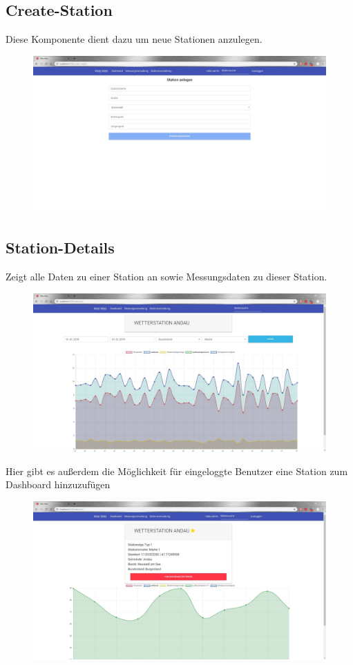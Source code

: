 \documentclass[10pt,a4paper,margin=0pt]{scrartcl}
\begin{document}
\subsection{Create-Station}
Diese Komponente dient dazu um neue Stationen anzulegen.
\begin{figure}[H]
\includegraphics[width=\textwidth]{./img/station-add.jpg}
\centering
\end{figure}
\subsection{Station-Details}
Zeigt alle Daten zu einer Station an sowie Messungsdaten zu dieser Station.
\begin{figure}[H]
	\includegraphics[width=\textwidth]{./img/station-detail.jpg}
	\centering
\end{figure}
Hier gibt es außerdem die Möglichkeit für eingeloggte Benutzer eine Station zum Dashboard hinzuzufügen
\begin{figure}[H]
	\includegraphics[width=\textwidth]{./img/station-detail1.jpg}
	\centering
\end{figure}
\end{document}
